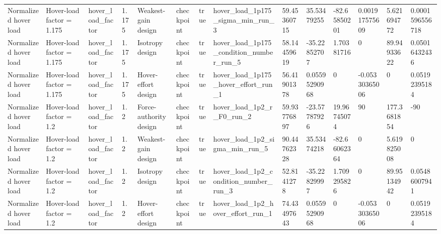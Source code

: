 \begin{tabular}{@{}llllllllllllll@{}}
Normalized hover load & Hover-load factor = 1.175 & hover\_load\_factor & 1.175 & Weakest-gain design & checkpoint & true & hover\_load\_1p175\_sigma\_min\_run\_3 & 59.45360715 & 35.53479255 & -82.65850201 & 0.001917575609 & 5.621694772 & 0.0001596556718 \\
Normalized hover load & Hover-load factor = 1.175 & hover\_load\_factor & 1.175 & Isotropy design & checkpoint & true & hover\_load\_1p175\_condition\_number\_run\_5 & 58.14459619 & -35.22852707 & 1.70381716 & 0 & 89.94933622 & 0.05016432436 \\
Normalized hover load & Hover-load factor = 1.175 & hover\_load\_factor & 1.175 & Hover-effort design & checkpoint & true & hover\_load\_1p175\_hover\_effort\_run\_1 & 56.41901378 & 0.05595290968 & 0 & -0.05330365006 & 0 & 0.05192395184 \\
Normalized hover load & Hover-load factor = 1.2 & hover\_load\_factor & 1.2 & Force-authority design & checkpoint & true & hover\_load\_1p2\_r\_F0\_run\_2 & 59.93776897 & -23.57787926 & 19.96745074 & 90 & 177.3681854 & -90 \\
Normalized hover load & Hover-load factor = 1.2 & hover\_load\_factor & 1.2 & Weakest-gain design & checkpoint & true & hover\_load\_1p2\_sigma\_min\_run\_5 & 90.44762328 & 35.53474218 & -82.66062364 & 0 & 5.619825008 & 0 \\
Normalized hover load & Hover-load factor = 1.2 & hover\_load\_factor & 1.2 & Isotropy design & checkpoint & true & hover\_load\_1p2\_condition\_number\_run\_3 & 52.8141278 & -35.22829997 & 1.709295826 & 0 & 89.95134942 & 0.05486007941 \\
Normalized hover load & Hover-load factor = 1.2 & hover\_load\_factor & 1.2 & Hover-effort design & checkpoint & true & hover\_load\_1p2\_hover\_effort\_run\_1 & 74.43497643 & 0.05595290968 & 0 & -0.05330365006 & 0 & 0.05192395184 \\
\bottomrule
\end{tabular}

